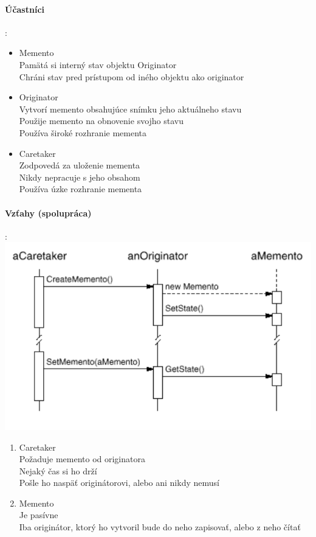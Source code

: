 		\paragraph{Účastníci}:\\
			\begin{itemize}
			\item Memento\\
				Pamätá si interný stav objektu Originator\\
				Chráni stav pred prístupom od iného objektu ako originator
			\item Originator\\
				Vytvorí memento obsahujúce snímku jeho aktuálneho stavu\\
				Použije memento na obnovenie svojho stavu\\
				Používa široké rozhranie mementa
			\item Caretaker\\
				Zodpovedá za uloženie mementa\\
				Nikdy nepracuje s jeho obsahom\\
				Používa úzke rozhranie mementa
			\end{itemize}
		\paragraph{Vzťahy (spolupráca)}:\\

			\includegraphics[width=.7\textwidth]{images/programovanie/memento2}
				\begin{enumerate}
				\item Caretaker\\
					Požaduje memento od originatora\\
					Nejaký čas si ho drží\\
					Pošle ho naspäť originátorovi, alebo ani nikdy nemusí
				\item Memento\\
					Je pasívne\\
					Iba originátor, ktorý ho vytvoril bude do neho zapisovať, alebo z neho čítať
				\end{enumerate}
